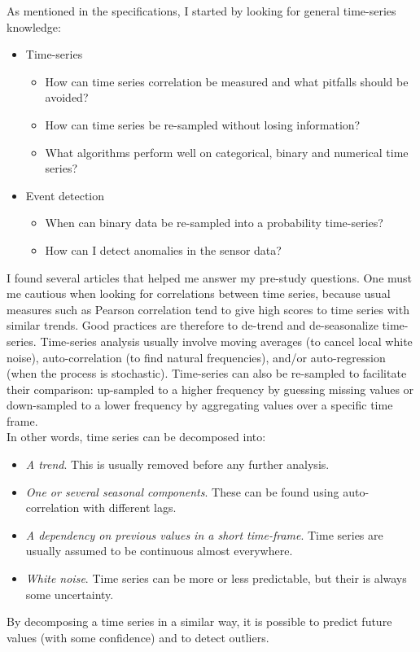 \documentclass[12pt,a4paper]{article}
\begin{document}
As mentioned in the specifications, I started by looking for general time-series knowledge:
\begin{itemize}
    \item Time-series
    \begin{itemize}
        \item How can time series correlation be measured and what pitfalls should be avoided?
        \item How can time series be re-sampled without losing information?
        \item What algorithms perform well on categorical, binary and numerical time series?
    \end{itemize}
    \item Event detection
    \begin{itemize}
        \item When can binary data be re-sampled into a probability time-series?
        \item How can I detect anomalies in the sensor data?
    \end{itemize}
\end{itemize}

I found several articles that helped me answer my pre-study questions. One must me cautious when looking for correlations between time series, because usual measures such as Pearson correlation tend to give high scores to time series with similar trends. Good practices are therefore to de-trend and de-seasonalize time-series. Time-series analysis usually involve moving averages (to cancel local white noise), auto-correlation (to find natural frequencies), and/or auto-regression (when the process is stochastic). Time-series can also be re-sampled to facilitate their comparison: up-sampled to a higher frequency by guessing missing values or down-sampled to a lower frequency by aggregating values over a specific time frame. \\

In other words, time series can be decomposed into:
\begin{itemize}
    \item \textit{A trend}. This is usually removed before any further analysis.
    \item \textit{One or several seasonal components}. These can be found using auto-correlation with different lags.
    \item \textit{A dependency on previous values in a short time-frame}. Time series are usually assumed to be continuous almost everywhere.
    \item \textit{White noise}. Time series can be more or less predictable, but their is always some uncertainty.
\end{itemize}
By decomposing a time series in a similar way, it is possible to predict future values (with some confidence) and to detect outliers.\\
\end{document}

